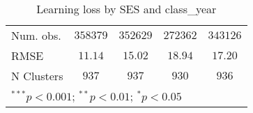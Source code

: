 \begin{table}
\begin{center}
\begin{tabular}{l c c c c}
Num. obs.                   & $358379$      & $352629$      & $272362$     & $343126$      \\
RMSE                        & $11.14$       & $15.02$       & $18.94$      & $17.20$       \\
N Clusters                  & $937$         & $937$         & $930$        & $936$         \\
\hline
\multicolumn{5}{l}{\scriptsize{$^{***}p<0.001$; $^{**}p<0.01$; $^{*}p<0.05$}}
\end{tabular}
\caption{Learning loss by SES and class_year}
\label{table_ses_class_year}
\end{center}
\end{table}
